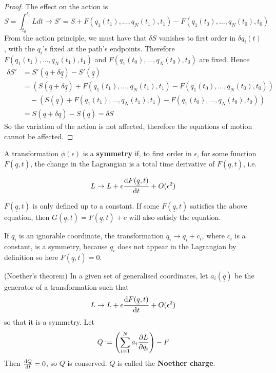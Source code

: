 \begin{proof}
	The effect on the action is
	\[
		S = \int_{t_0}^{t_1} L dt \rightarrow S' = S + F(q_1(t_1), \dots, q_N(t_1), t_1) - F(q_1(t_0), \dots, q_N(t_0), t_0)
	\]
	From the action principle, we must have that $\delta S$ vanishes to first order in $\delta q_i(t)$, with the $q_i$'s fixed at the path's endpoints. Therefore $F(q_1(t_1), \dots, q_N(t_1), t_1)$ and $F(q_1(t_0), \dots, q_N(t_0), t_0)$ are fixed. Hence
	\[
		\begin{aligned}
			\delta S' & = S'(\underline{q} + \delta \underline{q}) - S'(\underline{q}) \\
			& = (S(\underline{q} + \delta \underline{q}) + F(q_1(t_1), \dots, q_N(t_1), t_1) - F(q_1(t_0), \dots, q_N(t_0), t_0)) \\
			& \quad - (S(\underline{q}) + F(q_1(t_1), \dots, q_N(t_1), t_1) - F(q_1(t_0), \dots, q_N(t_0), t_0)) \\
			& = S(\underline{q} + \delta\underline{q}) - S(\underline{q}) = \delta S
		\end{aligned}
	\]
	So the variation of the action is not affected, therefore the equations of motion cannot be affected.
\end{proof}

\begin{definition}
	A transformation $\phi(\epsilon)$ is a \textbf{symmetry} if, to first order in $\epsilon$, for some function $F(\underline{q}, t)$, the change in the Lagrangian is a total time derivative of $F(\underline{q}, t)$, i.e.

	\[
		L \rightarrow L + \epsilon \diff{F(\underline{q}, t)}{t} + O(\epsilon^2)
	\]
\end{definition}

\begin{remark}
	$F(\underline{q}, t)$ is only defined up to a constant. If some $F(\underline{q}, t)$ satisfies the above equation, then $G(\underline{q}, t) = F(\underline{q}, t) + c$ will also satisfy the equation.
\end{remark}

\begin{example}
	If $q_i$ is an ignorable coordinate, the transformation $q_i \rightarrow q_i + c_i$, where $c_i$ is a constant, is a symmetry, because $q_i$ does not appear in the Lagrangian by definition so here $F(\underline{q}, t) = 0$.
\end{example}

\begin{theorem}
	(Noether's theorem) In a given set of generalised coordinates, let $a_i(\underline{q})$ be the generator of a transformation such that
	\[
		L \rightarrow L + \epsilon \diff{F(\underline{q}, t)}{t} + O(\epsilon^2)
	\]
	so that it is a symmetry. Let
	\[
		Q := \left( \sum_{i = 1}^N a_i \diffp{L}{\dot{q}_i} \right) - F
	\]
	Then $\diff{Q}{t} = 0$, so $Q$ is conserved. $Q$ is called the \textbf{Noether charge}.
\end{theorem}

